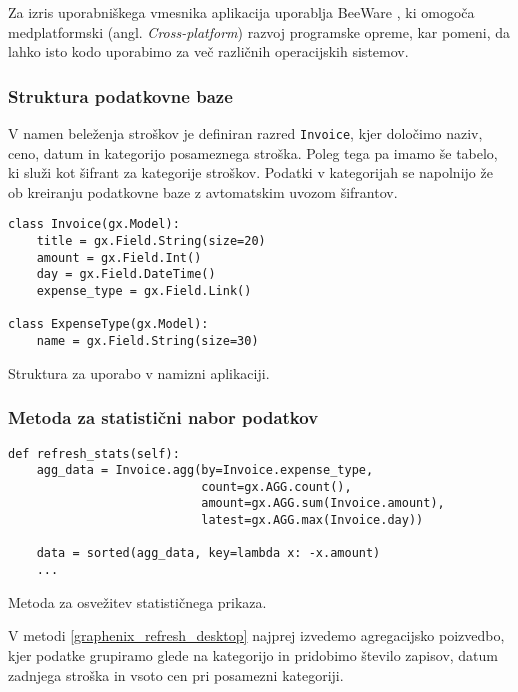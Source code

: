 \documentclass[a4paper,12pt,openright]{book}
\begin{document}
    Za izris uporabniškega vmesnika aplikacija uporablja BeeWare \cite{BEE_WARE}, ki omogoča medplatformski (angl. \textit{Cross-platform}) razvoj programske opreme, kar pomeni, da lahko isto kodo uporabimo za več različnih operacijskih sistemov.

    \subsubsection{Struktura podatkovne baze}

    V namen beleženja stroškov je definiran razred {\tt Invoice}, kjer določimo naziv, ceno, datum in kategorijo posameznega stroška.
    Poleg tega pa imamo še tabelo, ki služi kot šifrant za kategorije stroškov. Podatki v kategorijah se napolnijo že ob kreiranju podatkovne baze z avtomatskim uvozom šifrantov.
    
\begin{code}
\begin{verbatim}
class Invoice(gx.Model):
    title = gx.Field.String(size=20)
    amount = gx.Field.Int()
    day = gx.Field.DateTime()
    expense_type = gx.Field.Link()

class ExpenseType(gx.Model):
    name = gx.Field.String(size=30)
\end{verbatim}
\caption{Struktura za uporabo v namizni aplikaciji.}
\label{graphenix_schema_desktop}
\end{code}

    \subsubsection{Metoda za statistični nabor podatkov}

\begin{code}
\begin{verbatim}
def refresh_stats(self):
    agg_data = Invoice.agg(by=Invoice.expense_type,
                           count=gx.AGG.count(), 
                           amount=gx.AGG.sum(Invoice.amount), 
                           latest=gx.AGG.max(Invoice.day))
    
    data = sorted(agg_data, key=lambda x: -x.amount)
    ...
\end{verbatim}
\caption{Metoda za osvežitev statističnega prikaza.}
\label{graphenix_refresh_desktop}
\end{code}

    \noindent
    V metodi \ref{graphenix_refresh_desktop} najprej izvedemo agregacijsko poizvedbo, kjer podatke grupiramo glede na kategorijo in pridobimo število zapisov, datum zadnjega stroška in vsoto cen pri posamezni kategoriji.
\end{document}
